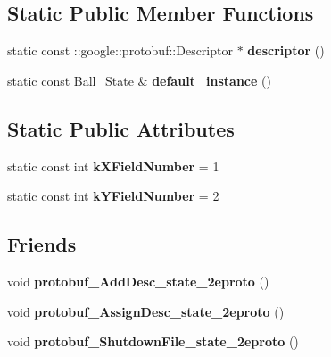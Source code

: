 \subsection*{Static Public Member Functions}
\begin{DoxyCompactItemize}
\item 
static const \+::google\+::protobuf\+::\+Descriptor $\ast$ {\bfseries descriptor} ()\hypertarget{classvss__state_1_1Ball__State_adfc29a0088d19129c759d22494a74443}{}\label{classvss__state_1_1Ball__State_adfc29a0088d19129c759d22494a74443}

\item 
static const \hyperlink{classvss__state_1_1Ball__State}{Ball\+\_\+\+State} \& {\bfseries default\+\_\+instance} ()\hypertarget{classvss__state_1_1Ball__State_a762be08a3ad7dcbec17beb380b860f95}{}\label{classvss__state_1_1Ball__State_a762be08a3ad7dcbec17beb380b860f95}

\end{DoxyCompactItemize}
\subsection*{Static Public Attributes}
\begin{DoxyCompactItemize}
\item 
static const int {\bfseries k\+X\+Field\+Number} = 1\hypertarget{classvss__state_1_1Ball__State_a35cabd2e3579b0e203e5acd1e77cfcad}{}\label{classvss__state_1_1Ball__State_a35cabd2e3579b0e203e5acd1e77cfcad}

\item 
static const int {\bfseries k\+Y\+Field\+Number} = 2\hypertarget{classvss__state_1_1Ball__State_a70e818ce92aeb6531c7a163f1b0f2194}{}\label{classvss__state_1_1Ball__State_a70e818ce92aeb6531c7a163f1b0f2194}

\end{DoxyCompactItemize}
\subsection*{Friends}
\begin{DoxyCompactItemize}
\item 
void {\bfseries protobuf\+\_\+\+Add\+Desc\+\_\+state\+\_\+2eproto} ()\hypertarget{classvss__state_1_1Ball__State_aab1a2c258f8122a403a979ff57e2a706}{}\label{classvss__state_1_1Ball__State_aab1a2c258f8122a403a979ff57e2a706}

\item 
void {\bfseries protobuf\+\_\+\+Assign\+Desc\+\_\+state\+\_\+2eproto} ()\hypertarget{classvss__state_1_1Ball__State_a57d9367bc8a7a94ead11d11194cca1b6}{}\label{classvss__state_1_1Ball__State_a57d9367bc8a7a94ead11d11194cca1b6}

\item 
void {\bfseries protobuf\+\_\+\+Shutdown\+File\+\_\+state\+\_\+2eproto} ()\hypertarget{classvss__state_1_1Ball__State_a4e6dc5e8e72799859c4e9556d090e57d}{}\label{classvss__state_1_1Ball__State_a4e6dc5e8e72799859c4e9556d090e57d}

\end{DoxyCompactItemize}


